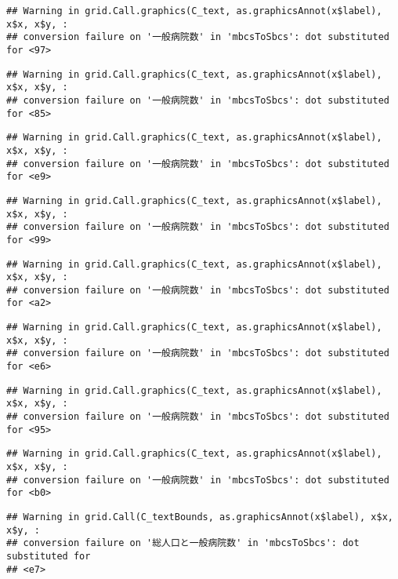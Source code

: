 \documentclass[
]{article}
\begin{document}
\begin{verbatim}
## Warning in grid.Call.graphics(C_text, as.graphicsAnnot(x$label), x$x, x$y, :
## conversion failure on '一般病院数' in 'mbcsToSbcs': dot substituted for <97>
\end{verbatim}

\begin{verbatim}
## Warning in grid.Call.graphics(C_text, as.graphicsAnnot(x$label), x$x, x$y, :
## conversion failure on '一般病院数' in 'mbcsToSbcs': dot substituted for <85>
\end{verbatim}

\begin{verbatim}
## Warning in grid.Call.graphics(C_text, as.graphicsAnnot(x$label), x$x, x$y, :
## conversion failure on '一般病院数' in 'mbcsToSbcs': dot substituted for <e9>
\end{verbatim}

\begin{verbatim}
## Warning in grid.Call.graphics(C_text, as.graphicsAnnot(x$label), x$x, x$y, :
## conversion failure on '一般病院数' in 'mbcsToSbcs': dot substituted for <99>
\end{verbatim}

\begin{verbatim}
## Warning in grid.Call.graphics(C_text, as.graphicsAnnot(x$label), x$x, x$y, :
## conversion failure on '一般病院数' in 'mbcsToSbcs': dot substituted for <a2>
\end{verbatim}

\begin{verbatim}
## Warning in grid.Call.graphics(C_text, as.graphicsAnnot(x$label), x$x, x$y, :
## conversion failure on '一般病院数' in 'mbcsToSbcs': dot substituted for <e6>
\end{verbatim}

\begin{verbatim}
## Warning in grid.Call.graphics(C_text, as.graphicsAnnot(x$label), x$x, x$y, :
## conversion failure on '一般病院数' in 'mbcsToSbcs': dot substituted for <95>
\end{verbatim}

\begin{verbatim}
## Warning in grid.Call.graphics(C_text, as.graphicsAnnot(x$label), x$x, x$y, :
## conversion failure on '一般病院数' in 'mbcsToSbcs': dot substituted for <b0>
\end{verbatim}

\begin{verbatim}
## Warning in grid.Call(C_textBounds, as.graphicsAnnot(x$label), x$x, x$y, :
## conversion failure on '総人口と一般病院数' in 'mbcsToSbcs': dot substituted for
## <e7>
\end{verbatim}
\end{document}
